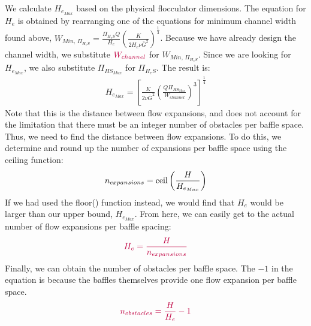 \documentclass[letterpaper,10pt,english]{sphinxmanual}
\begin{document}
We calculate \(H_{e_{Max}}\) based on the physical flocculator dimensions. The equation for \(H_e\) is obtained by rearranging one of the equations for minimum channel width found above, \(W_{Min, \, \Pi_{H_eS}} = \frac{\Pi_{H_eS}Q}{H_e}\left( \frac{K}{2 H_e \nu \bar G^2} \right)^\frac{1}{3}\). Because we have already design the channel width, we substitute \(\color{purple}{W_{channel}}\) for \(W_{Min, \, \Pi_{H_eS}}\). Since we are looking for \(H_{e_{Max}}\), we also substitute \(\Pi_{{HS}_{Max}}\) for \(\Pi_{H_eS}\). The result is:
\begin{equation}\label{equation:Flocculation/Floc_Design:Flocculation/Floc_Design:25}
\begin{split}H_{e_{Max}} = \left[ \frac{K}{2 \nu \bar G^2} \left( \frac{Q \Pi_{{HS}_{Max}}}{W_{channel}} \right)^3 \right]^\frac{1}{4}\end{split}
\end{equation}
Note that this is the  distance between flow expansions, and does not account for the limitation that there must be an integer number of obstacles per baffle space. Thus, we need to find the  distance between flow expansions. To do this, we determine and round up the number of expansions per baffle space using the ceiling function:
\begin{equation}\label{equation:Flocculation/Floc_Design:Flocculation/Floc_Design:26}
\begin{split}n_{expansions} = {\rm ceil}\left( \frac{H}{H_{e_{Max}}} \right)\end{split}
\end{equation}
If we had used the floor() function instead, we would find that \(H_e\) would be larger than our upper bound, \(H_{e_{Max}}\). From here, we can easily get to the actual number of flow expansions per baffle spacing:
\begin{equation}\label{equation:Flocculation/Floc_Design:Flocculation/Floc_Design:27}
\begin{split}\color{purple}{
  H_e = \frac{H}{n_{expansions}}
  }\end{split}
\end{equation}
Finally, we can obtain the number of obstacles per baffle space. The \(- 1\) in the equation is because the baffles themselves provide one flow expansion per baffle space.
\begin{equation}\label{equation:Flocculation/Floc_Design:Flocculation/Floc_Design:28}
\begin{split}\color{purple}{n_{obstacles} = \frac{H}{H_e} - 1}\end{split}
\end{equation}
\end{document}
